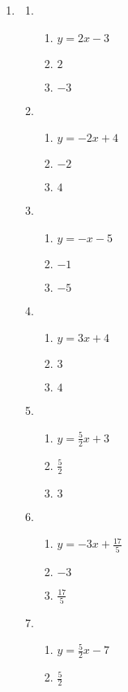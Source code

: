\documentclass[a4paper,12pt]{article}
\begin{document}
\begin{enumerate}
\item
    \begin{multicols}{2}
    \begin{enumerate}
    \item
        \begin{enumerate}
        \item $y = 2x - 3$
        \item $2$
        \item $-3$
        \end{enumerate}
    \item
        \begin{enumerate}
        \item $y = -2x + 4$
        \item $-2$
        \item $4$
        \end{enumerate}
    \item
        \begin{enumerate}
        \item $y = -x - 5$
        \item $-1$
        \item $-5$
        \end{enumerate}
    \item
        \begin{enumerate}
        \item $y = 3x + 4$
        \item $3$
        \item $4$
        \end{enumerate}
    \item
        \begin{enumerate}
        \item $y = \frac{5}{2}x + 3$
        \item $\frac{5}{2}$
        \item $3$
        \end{enumerate}
    \item
        \begin{enumerate}
        \item $y = -3x + \frac{17}{5}$
        \item $-3$
        \item $\frac{17}{5}$
        \end{enumerate}
    \item
        \begin{enumerate}
        \item $y = \frac{5}{2}x - 7$
        \item $\frac{5}{2}$

\end{enumerate}
\end{enumerate}
\end{multicols}
\end{enumerate}
\end{document}
